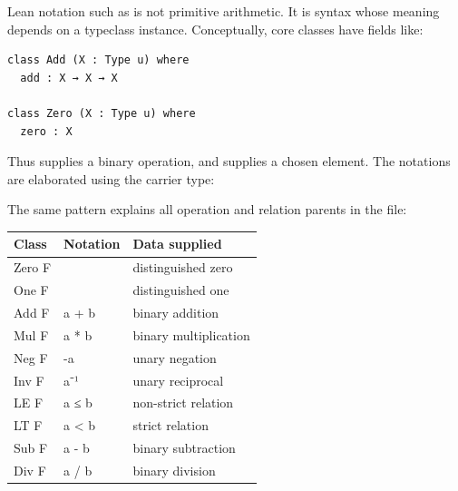 \documentclass[11pt]{article}
\newcommand{\code}[1]{\texttt{\detokenize{#1}}}
\begin{document}
Lean notation such as \code{a + b} is not primitive arithmetic. It is syntax whose
meaning depends on a typeclass instance. Conceptually, core classes have fields like:

\begin{lstlisting}
class Add (X : Type u) where
  add : X → X → X

class Zero (X : Type u) where
  zero : X
\end{lstlisting}

Thus \code{[Add X]} supplies a binary operation, and \code{[Zero X]} supplies a chosen
element. The notations are elaborated using the carrier type:

\begin{center}
\end{center}

The same pattern explains all operation and relation parents in the file:

\begin{longtable}{@{}>{\ttfamily}p{}>{\ttfamily}p{}p{}@{}}
\toprule
\normalfont\bfseries Class & \normalfont\bfseries Notation & \bfseries Data supplied \\
\midrule
\endhead
Zero F & 0 & distinguished zero \\
One F & 1 & distinguished one \\
Add F & a + b & binary addition \\
Mul F & a * b & binary multiplication \\
Neg F & -a & unary negation \\
Inv F & a⁻¹ & unary reciprocal \\
LE F & a ≤ b & non-strict relation \\
LT F & a < b & strict relation \\
Sub F & a - b & binary subtraction \\
Div F & a / b & binary division \\
\bottomrule
\end{longtable}
\end{document}
